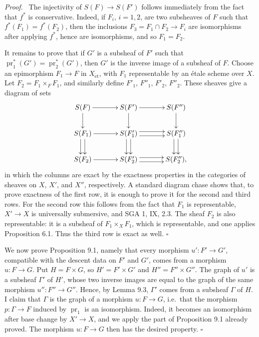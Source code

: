 \documentclass[11pt]{article}
\newcommand{\pr}{\operatorname{pr}}
\newcommand{\et}{\mathrm{\acute{e}t}}
\newcommand{\ie}{i.e.\ }
\newcommand{\SGA}{SGA}
\newcommand{\qedtext}{\hfill\(\square\)}
\newenvironment{prooftext}{\par\noindent\emph{Proof.}\ }{\par\medskip}
\begin{document}
\begin{prooftext}
The injectivity of \(S(F)\to S(F')\) follows immediately from the fact that \(f^*\) is conservative. Indeed, if \(F_i\), \(i=1,2\), are two subsheaves of \(F\) such that \(f^*(F_1)=f^*(F_2)\), then the inclusions \(F_3=F_1\cap F_2\to F_i\) are isomorphisms after applying \(f^*\), hence are isomorphisms, and so \(F_1=F_2\).

It remains to prove that if \(G'\) is a subsheaf of \(F'\) such that \(\pr_1^*(G')=\pr_2^*(G')\), then \(G'\) is the inverse image of a subsheaf of \(F\). Choose an epimorphism \(F_1\to F\) in \(X_{\et}\), with \(F_1\) representable by an \'etale scheme over \(X\). Let \(F_2=F_1\times_FF_1\), and similarly define \(F'_1\), \(F''_1\), \(F'_2\), \(F''_2\). These sheaves give a diagram of sets
\[
\xymatrix@R=.75cm@C=1.2cm{
S(F)\ar[r]\ar[d]&S(F')\ar[r]\ar[d]&S(F'')\ar[d]\\
S(F_1)\ar[r]\ar@<3pt>[d]\ar@<-3pt>[d]&S(F'_1)\ar@<3pt>[r]\ar@<-3pt>[r]\ar@<3pt>[d]\ar@<-3pt>[d]&S(F''_1)\ar@<3pt>[d]\ar@<-3pt>[d]\\
S(F_2)\ar[r]&S(F'_2)\ar@<3pt>[r]\ar@<-3pt>[r]&S(F''_2),
}
\]
in which the columns are exact by the exactness properties in the categories of sheaves on \(X\), \(X'\), and \(X''\), respectively. A standard diagram chase shows that, to prove exactness of the first row, it is enough to prove it for the second and third rows. For the second row this follows from the fact that \(F_1\) is representable, \(X'\to X\) is universally submersive, and \SGA{} 1, IX, 2.3. The sheaf \(F_2\) is also representable: it is a subsheaf of \(F_1\times_XF_1\), which is representable, and one applies Proposition 6.1. Thus the third row is exact as well. \qedtext
\end{prooftext}

We now prove Proposition 9.1, namely that every morphism \(u':F'\to G'\), compatible with the descent data on \(F'\) and \(G'\), comes from a morphism \(u:F\to G\). Put \(H=F\times G\), so \(H'=F'\times G'\) and \(H''=F''\times G''\). The graph of \(u'\) is a subsheaf \(\Gamma'\) of \(H'\), whose two inverse images are equal to the graph of the same morphism \(u'':F''\to G''\). Hence, by Lemma 9.3, \(\Gamma'\) comes from a subsheaf \(\Gamma\) of \(H\). I claim that \(\Gamma\) is the graph of a morphism \(u:F\to G\), \ie that the morphism \(p:\Gamma\to F\) induced by \(\pr_1\) is an isomorphism. Indeed, it becomes an isomorphism after base change by \(X'\to X\), and we apply the part of Proposition 9.1 already proved. The morphism \(u:F\to G\) then has the desired property. \qedtext
\end{document}
